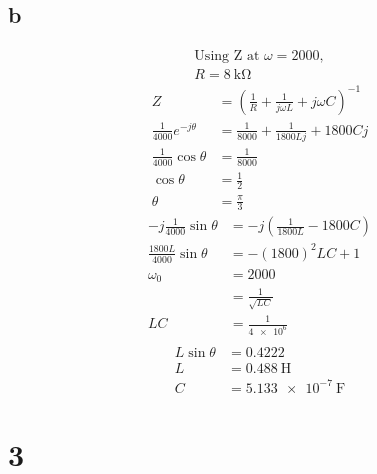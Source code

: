 \documentclass{article}
\begin{document}
\begin{multicols}{2}
    \subsection*{b}
    \begin{align*}
        \text{Using Z at } \omega = 2000, \\
        R= \boxed{\SI{8}{\kilo\ohm}}
    \end{align*}
    \begin{align*}
        Z                            & =\left( \frac{1}{R} + \frac{1}{j \omega L} + j \omega C \right) ^{-1} \\
        \frac{1}{4000} e^{-j \theta} & = \frac{1}{8000} + \frac{1}{1800 L j} + 1800 C j                      \\
        \frac{1}{4000} \cos \theta   & = \frac{1}{8000}                                                      \\
        \cos\theta                   & = \frac{1}{2}                                                         \\
        \theta                       & = \frac{\pi}{3}
    \end{align*}
    \begin{align*}
        -j\frac{1}{4000} \sin\theta   & = -j\left( \frac{1}{1800L} - 1800 C\right) \\
        \frac{1800L}{4000} \sin\theta & = -(1800)^2 LC + 1                         \\
        \omega_0                      & = 2000                                     \\
                                      & = \frac{1}{\sqrt{LC}}                      \\
        LC                            & = \frac{1}{\num{4e6}}                      \\
    \end{align*}
    \begin{align*}
        L\sin\theta & = 0.4222                        \\
        L           & = \boxed{\SI{0.488}{\henry}}    \\
        C           & = \boxed{\SI{5.133e-7}{\farad}}
    \end{align*}

    \section*{3}

\end{multicols}
\end{document}
